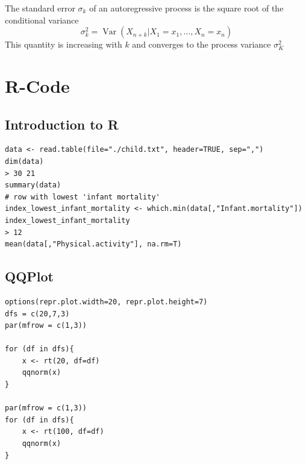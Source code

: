 \documentclass[11pt]{article}
\newcommand*\Var[1]{\mathop{\text{Var}}\left(#1\right)}
\begin{document}
The standard error $\sigma_k$ of an autoregressive process is the square root of the conditional variance
\begin{equation*}
	\sigma_k^2 = \Var{X_{n+k}|X_1= x_1,\dots, X_n = x_n}
\end{equation*}
This quantity is increasing with $k$ and converges to the process variance $\sigma_K^2$

\clearpage
\appendix

\section{R-Code}
\subsection{Introduction to R}
\begin{verbatim}
data <- read.table(file="./child.txt", header=TRUE, sep=",")
dim(data)
> 30 21
summary(data)
# row with lowest 'infant mortality'
index_lowest_infant_mortality <- which.min(data[,"Infant.mortality"])
index_lowest_infant_mortality
> 12
mean(data[,"Physical.activity"], na.rm=T)
\end{verbatim}

\subsection{QQPlot}
\begin{verbatim}
options(repr.plot.width=20, repr.plot.height=7)
dfs = c(20,7,3)
par(mfrow = c(1,3))

for (df in dfs){
	x <- rt(20, df=df)
	qqnorm(x)
}

par(mfrow = c(1,3))
for (df in dfs){
	x <- rt(100, df=df)
	qqnorm(x)
}
\end{verbatim}
\end{document}
